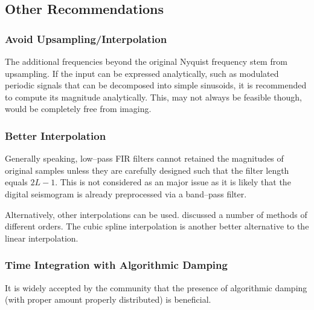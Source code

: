 \subsection{Other Recommendations}
\subsubsection{Avoid Upsampling/Interpolation}
The additional frequencies beyond the original Nyquist frequency stem from upsampling. If the input can be expressed analytically, such as modulated periodic signals that can be decomposed into simple sinusoids, it is recommended to compute its magnitude analytically. This, may not always be feasible though, would be completely free from imaging.
\subsubsection{Better Interpolation}
Generally speaking, low--pass FIR filters cannot retained the magnitudes of original samples unless they are carefully designed such that the filter length equals $2L-1$. This is not considered as an major issue as it is likely that the digital seismogram is already preprocessed via a band--pass filter.

Alternatively, other interpolations can be used. \citet{Lee1989} discussed a number of methods of different orders. The cubic spline interpolation \citep[see][\S~3.5]{Burden2011} is another better alternative to the linear interpolation.
\subsubsection{Time Integration with Algorithmic Damping}
It is widely accepted by the community that the presence of algorithmic damping (with proper amount properly distributed) is beneficial.

